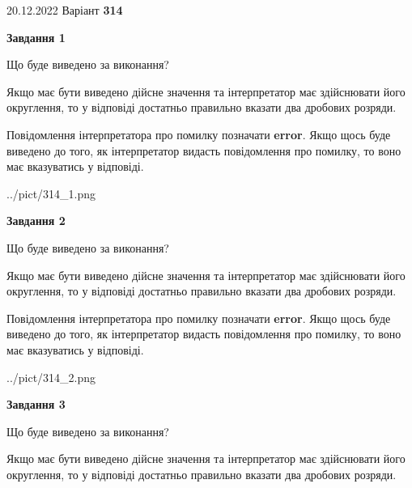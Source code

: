 \documentclass[12pt, ukrainian]{article}
\begin{document}
{20.12.2022 Варіант \No \textbf { 314 }\par}
{
\begin {Large}

{\begin {center}\textbf{Завдання 1}\end {center}}\par
Що буде виведено за виконання? \par

Якщо має бути виведено дійсне значення та інтерпретатор має здійснювати його округлення, 
то у відповіді достатньо правильно вказати два дробових розряди.

Повідомлення інтерпретатора про помилку позначати \textbf{error}.
Якщо щось буде виведено до того, як інтерпретатор видасть повідомлення про помилку, 
то воно має вказуватись у відповіді. \par

\begin{center}
	{../pict/314_1.png}
\end{center}
\newpage

{\begin {center}\textbf{Завдання 2}\end {center}}\par
Що буде виведено за виконання? \par

Якщо має бути виведено дійсне значення та інтерпретатор має здійснювати його округлення, 
то у відповіді достатньо правильно вказати два дробових розряди.

Повідомлення інтерпретатора про помилку позначати \textbf{error}.
Якщо щось буде виведено до того, як інтерпретатор видасть повідомлення про помилку, 
то воно має вказуватись у відповіді. \par

\begin{center}
	{../pict/314_2.png}
\end{center}
\newpage

{\begin {center}\textbf{Завдання 3}\end {center}}\par
Що буде виведено за виконання? \par

Якщо має бути виведено дійсне значення та інтерпретатор має здійснювати його округлення, 
то у відповіді достатньо правильно вказати два дробових розряди.


\end{Large}}
\end{document}
